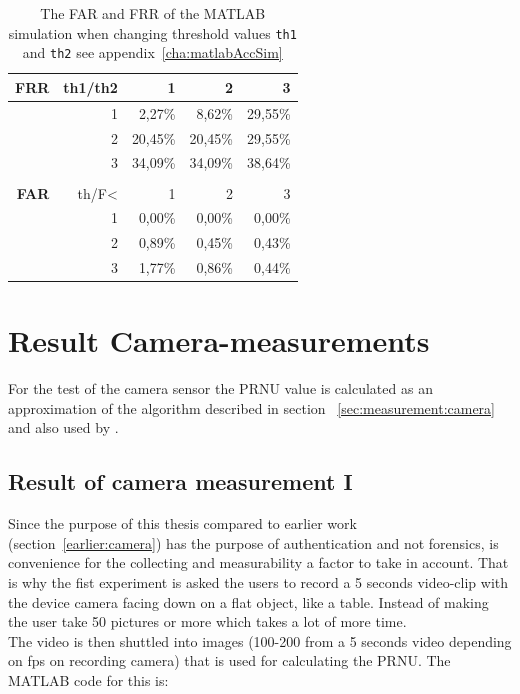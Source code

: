 \begin{table}[htbp]
  \centering
    \begin{tabular}{rrrrr}
    \toprule
    \textbf{FRR} & th1/th2 & 1     & 2     & 3 \\
    \midrule
          & 1     & 2,27\% & 8,62\% & 29,55\% \\
          & 2     & 20,45\% & 20,45\% & 29,55\% \\
          & 3     & 34,09\% & 34,09\% & 38,64\% \\
          &       &       &       &  \\
    \textbf{FAR} & th/F< & 1     & 2     & 3 \\
          & 1     & 0,00\% & 0,00\% & 0,00\% \\
          & 2     & 0,89\% & 0,45\% & 0,43\% \\
          & 3     & 1,77\% & 0,86\% & 0,44\% \\
    \bottomrule
    \end{tabular}%
    \caption{The FAR and FRR of the MATLAB simulation when changing threshold values \texttt{th1} and \texttt{th2} see appendix~\ref{cha:matlabAccSim}}
  \label{tab:farfrr}%
\end{table}%


\section{Result Camera-measurements}\label{sec:ResCam}
For the test of the camera sensor the PRNU value is calculated as an approximation of the algorithm described in section ~\ref{sec:measurement:camera} and also used by \cite{sensor:camera:DCIdent}. 

\subsection{Result of camera measurement I}
Since the purpose of this thesis compared to earlier work (section~\ref{earlier:camera}) has the purpose of authentication and not forensics, is convenience for the collecting and measurability a factor to take in account. That is why the fist experiment is asked the users to record a 5 seconds video-clip with the device camera facing down on a flat object, like a table. Instead of making the user take 50 pictures or more which takes a lot of more time. \\
The video is then shuttled into images (100-200 from a 5 seconds video depending on fps on recording camera) that is used for calculating the PRNU. The MATLAB code for this is:\\


